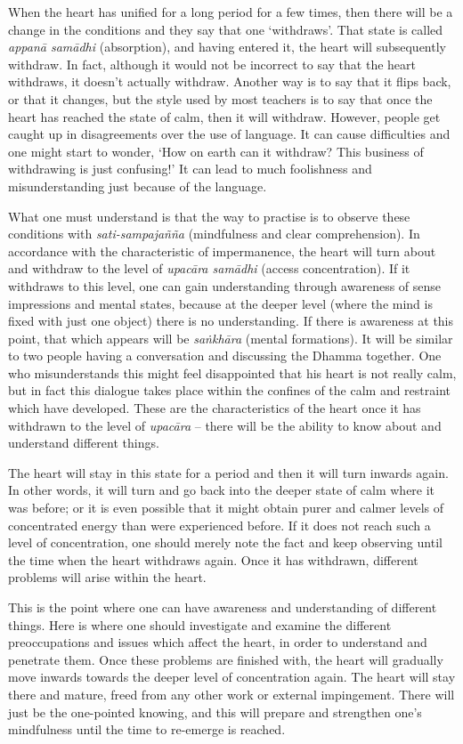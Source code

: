 When the heart has unified for a long period for a few times, then there
will be a change in the conditions and they say that one `withdraws'. 
That state is called \emph{appanā samādhi} (absorption), and having
entered it, the heart will subsequently withdraw. In fact, although it
would not be incorrect to say that the heart withdraws, it doesn't
actually withdraw. Another way is to say that it flips back, or that it
changes, but the style used by most teachers is to say that once the
heart has reached the state of calm, then it will withdraw. However, 
people get caught up in disagreements over the use of language. It can
cause difficulties and one might start to wonder, `How on earth can it
withdraw? This business of withdrawing is just confusing!' It can lead
to much foolishness and misunderstanding just because of the language. 

What one must understand is that the way to practise is to observe these
conditions with \emph{sati-sampajañña} (mindfulness and clear
comprehension). In accordance with the characteristic of impermanence, 
the heart will turn about and withdraw to the level of \emph{upacāra
samādhi} (access concentration). If it withdraws to this level, one can
gain understanding through awareness of sense impressions and mental
states, because at the deeper level (where the mind is fixed with just
one object) there is no understanding. If there is awareness at this
point, that which appears will be \emph{saṅkhāra} (mental formations). 
It will be similar to two people having a conversation and discussing
the Dhamma together. One who misunderstands this might feel disappointed
that his heart is not really calm, but in fact this dialogue takes place
within the confines of the calm and restraint which have developed. 
These are the characteristics of the heart once it has withdrawn to the
level of \emph{upacāra} -- there will be the ability to know about and
understand different things. 

The heart will stay in this state for a period and then it will turn
inwards again. In other words, it will turn and go back into the deeper
state of calm where it was before; or it is even possible that it might
obtain purer and calmer levels of concentrated energy than were
experienced before. If it does not reach such a level of concentration, 
one should merely note the fact and keep observing until the time when
the heart withdraws again. Once it has withdrawn, different problems
will arise within the heart. 

This is the point where one can have awareness and understanding of
different things. Here is where one should investigate and examine the
different preoccupations and issues which affect the heart, in order to
understand and penetrate them. Once these problems are finished with, 
the heart will gradually move inwards towards the deeper level of
concentration again. The heart will stay there and mature, freed from
any other work or external impingement. There will just be the
one-pointed knowing, and this will prepare and strengthen one's
mindfulness until the time to re-emerge is reached. 

